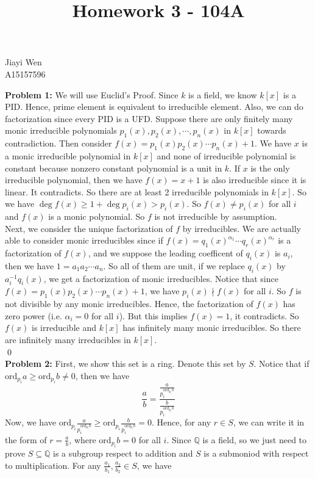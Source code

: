 \documentclass[12pt]{amsart}
\newcommand{\Q}{\mathbb{Q}}
\newcommand{\ord}{\text{ord}}
\begin{document}
\title{Homework 3 - 104A}
\maketitle
\begin{center}
    Jiayi Wen\\
    A15157596
\end{center}
\textbf{Problem 1:} We will use Euclid's Proof. Since $k$ is a field, we know $k[x]$ is a PID. Hence, prime element is equivalent to irreducible element. Also, we can do factorization since every PID is a UFD. Suppose there are only finitely many monic irreducible polynomials $p_1(x),p_2(x),\cdots, p_n(x)$ in $k[x]$ towards contradiction. Then consider $f(x)=p_1(x)p_2(x)\cdots p_n(x)+1$. We have $x$ is a monic irreducible polynomial in $k[x]$ and none of irreducible polynomial is constant because nonzero constant polynomial is a unit in $k$. If $x$ is the only irreducible polynomial, then we have $f(x)=x+1$ is also irreducible since it is linear. It contradicts. So there are at least 2 irreducible polynomials in $k[x]$. So we have $\deg f(x)\geq 1+\deg p_i(x)>p_i(x)$. So $f(x)\neq p_i(x)$ for all $i$ and $f(x)$ is a monic polynomial. So $f$ is not irreducible by assumption. \\
Next, we consider the unique factorization of $f$ by irreducibles. We are actually able to consider monic irreducibles since if $f(x)=q_1(x)^{\alpha_1}\cdots q_r(x)^{\alpha_r}$ is a factorization of $f(x)$, and we suppose the leading coefficent of $q_i(x)$ is $a_i$, then we have $1=a_1a_2\cdots a_n$. So all of them are unit, if we replace $q_i(x)$ by $a_i^{-1}q_i(x)$, we get a factorization of monic irreducibles. Notice that since $f(x)=p_1(x)p_2(x) \cdots p_n(x) +1$, we have $p_i(x)\nmid f(x)$ for all $i.$ So $f$ is not divisible by any monic irreducibles. Hence, the factorization of $f(x)$ has zero power (i.e. $\alpha_i=0$ for all $i$). But this implies $f(x)=1$, it contradicts. So $f(x)$ is irreducible and $k[x]$ has infinitely many monic irreducibles. So there are infinitely many irreducibles in $k[x]$.\\\qed\\
\textbf{Problem 2:} First, we show this set is a ring. Denote this set by $S$. Notice that if $\ord_{p_i}a\geq \ord_{p_i}b\neq 0$, then we have
\[\frac{a}{b}=\frac{\frac{a}{p_i^{\ord_{p_i}b}}}{\frac{b}{p_i^{\ord_{p_i}b}}}\]
Now, we have $\ord_{p_i} \frac{a}{p_i^{\ord_{p_i}b}}\geq \ord_{p_i}\frac{b}{p_i^{\ord_{p_i}b}}=0$. Hence, for any $r\in S$, we can write it in the form of $r=\frac{a}{b}$, where $\ord_{p_i}b=0$ for all $i$. Since $\Q$ is a field, so we just need to prove $S\subseteq \Q$ is a subgroup respect to addition and $S$ is a submoniod with respect to multiplication. For any $\frac{a_1}{b_1},\frac{a_2}{b_2}\in S$, we have 
\end{document}
